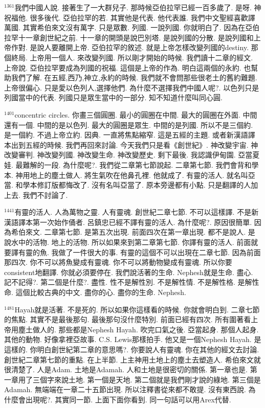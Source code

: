 \documentclass{book}
\begin{document}
$^{1361}$我們中國人說.
接著生了一大群兒子.
那時候亞伯拉罕已經一百多歲了.
是呀.
神祝福他.
很多後代.
亞伯拉罕的若.
其實他是代表.
他代表誰.
我們中文聖經喜歡譯萬國.
其實希伯來文沒有萬字.
只是眾數.
列國.
一說列國.
你就明白了.
因為在亞伯拉罕十一章創世紀之前.
十一章的開頭是說巴別塔.
是說列國的分散.
是說列國和上帝作對.
是說人要離開上帝.
亞伯拉罕的敘述.
就是上帝怎樣改變列國的destiny.
那個終局.
上帝用一個人.
來改變列國.
所以剛才開始的時候.
我們讀十二章的經文.
上帝說.
亞伯拉罕要成為列國的祝福.
這個是上帝的作為.
明白這兩個的永約.
也幫助我們了解.
在五經,西乃,神立,永約的時候.
我們就不會問那些很老土的舊約難題.
上帝很偏心.
只是愛以色列人,選擇他們.
為什麼不選擇我們中國人呢?.
以色列只是列國當中的代表.
列國只是眾生當中的一部分.
知不知道什麼叫同心圓.

$^{1401}$concentric circles.
你畫三個圓圈.
最小的圓圈在中間.
最大的圓圈在外面.
中間還有一個.
中間的是以色列.
最大的圓圈是眾生.
中間的是列國.
所以不是三個約.
是一個約.
不過上帝立約.
因典.
一直將焦點縮窄.
這是五經的主題.
或者新漢語譯本出到五經的時候.
我們再回來討論.
今天我們只是看《創世紀》.
神改變宇宙.
神改變審判.
神改變列國.
神改變生命.
神改變歷史.
剩下最後.
我認識伊甸園.
亞當夏娃.
最難解的一段.
為什麼呢?.
我們從二章第七節說起.
二章第七節.
我們會背和學本.
神用地上的塵土做人.
將生氣吹在他鼻孔裡.
他就成了.
有靈的活人.
就名叫亞當.
和學本修訂版都悔改了.
沒有名叫亞當了.
原本旁邊都有小點.
只是翻譯的人加上去.
我們不討論了.

$^{1441}$有靈的活人.
人為萬物之靈.
人有靈魂.
創世紀二章七節.
不可以這樣譯.
不是新漢語譯本第一次始作俑者.
呂鎮忠已經不譯有靈的活人.
為什麼呢?.
原因很簡單.
因為希伯來文.
二章第七節.
是第五次出現.
前面四次在第一章出現.
都不是說人.
是說水中的活物.
地上的活物.
所以如果來到第二章第七節.
你譯有靈的活人.
前面就要譯有靈的魚.
我做了一件很大的事.
有靈的這個不可以出現在二章七節.
因為前面那四次.
你不可以將魚變成有靈魂.
你不可以將動物變成有靈魂.
所以你要consistent地翻譯.
你就必須要停在.
我們說活著的生命.
Nephesh就是生命.
盡心.
記不記得?.
第二個是什麼?.
盡性.
性不是解性別.
不是解性情.
不是解性格.
是解性命.
這個比較古典的中文.
盡你的心.
盡你的生命.
Nephesh.

$^{1481}$Hayah就是活著.
不是死的.
所以如果你這樣看的時候.
你就會明白到.
二章七節的焦點.
其實不是最後那句.
最後那句沒什麼特別.
前面已經有四次.
所有圍著看上帝用塵土做人的.
那些都是Nephesh Hayah.
吹完口氣之後.
亞當起身.
那個人起身.
其他的動物.
好像拿裡亞故事.
C.S. Lewis那樣拍手.
他又是一個Nephesh Hayah.
是這樣的.
你明白創世紀第二章的意思嗎?.
你要說人有靈魂.
你在其他的經文去討論.
創世紀二章第七節的重點.
在上半節.
上主神用土地上的塵土去塑造人.
希伯來文就很清楚了.
人是Adam.
土地是Adamah.
人和土地是很密切的關係.
第一章也是.
第一章用了三個字來說土地.
第一個是天地.
第二個就是我們剛才說的綠地.
第三個是Adamah.
無端端在一章二十五節出現.
所以注釋書從來都不敢提.
沒有東西說.
為什麼會出現呢?.
其實同一節.
上面下面你看到.
同一句話可以用Arex代替.
\end{document}
